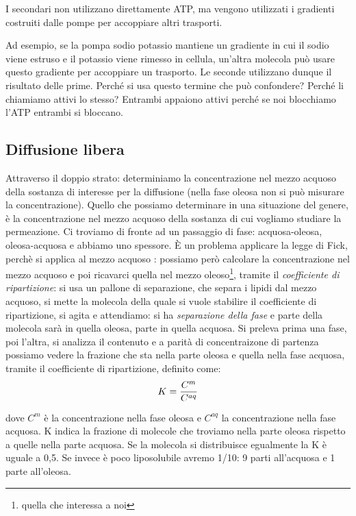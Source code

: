 \documentclass[a4paper,12pt]{article}
\begin{document}
I secondari non utilizzano direttamente ATP, ma vengono utilizzati i gradienti costruiti dalle pompe per accoppiare altri trasporti.

Ad esempio, se la pompa sodio potassio mantiene un gradiente in cui il sodio viene estruso e il potassio viene rimesso in cellula, un’altra molecola può usare questo gradiente per accoppiare un trasporto. Le seconde utilizzano dunque il risultato delle prime. Perché si usa questo termine che può confondere? Perché li chiamiamo attivi lo stesso? Entrambi appaiono attivi perché se noi blocchiamo l’ATP entrambi si bloccano.

\subsection{Diffusione libera}
Attraverso il doppio strato: determiniamo la concentrazione nel mezzo acquoso della sostanza di interesse per la diffusione (nella fase oleosa non si può misurare la concentrazione).
Quello che possiamo determinare in una situazione del genere, è la concentrazione nel mezzo acquoso della sostanza di cui vogliamo studiare la permeazione.
Ci troviamo di fronte ad un passaggio di fase: acquosa-oleosa, oleosa-acquosa e abbiamo uno spessore. È un problema applicare la legge di Fick, perchè si applica al mezzo acquoso : possiamo però calcolare la concentrazione nel mezzo acquoso e poi ricavarci quella nel mezzo oleoso\footnote{quella che interessa a noi}, tramite il \emph{coefficiente di ripartizione}: si usa un pallone di separazione, che separa i lipidi dal mezzo acquoso, si mette la molecola della quale si vuole stabilire il coefficiente di ripartizione, si agita e attendiamo: si ha \emph{separazione della fase} e parte della molecola sarà in quella oleosa, parte in quella acquosa. Si preleva prima una fase, poi l'altra, si analizza il contenuto e a parità di concentraizone di partenza possiamo vedere la frazione che sta nella parte oleosa e quella nella fase acquosa, tramite il coefficiente di ripartizione, definito come:
		\begin{equation}
		\centering
				K =\frac{C^{m}}{C^{aq}}  
		\end{equation}		
				  
dove $C^{m}$ è la concentrazione nella fase oleosa e $C^{aq}$ la concentrazione nella fase acquosa.
K indica la frazione di molecole che troviamo nella parte oleosa rispetto a quelle nella parte acquosa. Se la molecola si distribuisce egualmente la K è uguale a 0,5. Se invece è poco liposolubile avremo 1/10: 9 parti all’acquosa e 1 parte all’oleosa.
\end{document}
